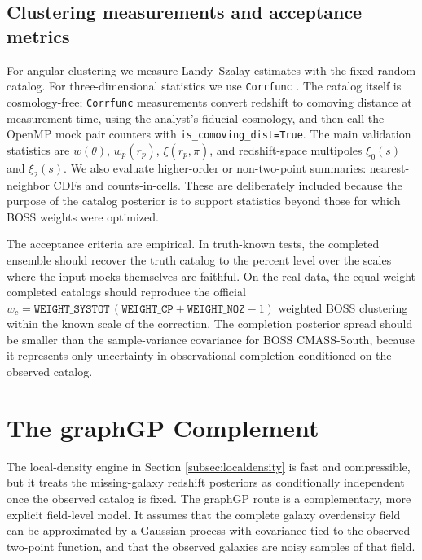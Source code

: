 \documentclass[apj]{emulateapj}
\begin{document}
\subsection{Clustering measurements and acceptance metrics}
\label{subsec:metrics}

For angular clustering we measure Landy--Szalay estimates
\citep{LandySzalay1993} with the fixed random catalog.  For three-dimensional
statistics we use \texttt{Corrfunc} \citep{Corrfunc2020}.  The catalog itself is
cosmology-free; \texttt{Corrfunc} measurements convert redshift to comoving
distance at measurement time, using the analyst's fiducial cosmology, and then
call the OpenMP mock pair counters with \texttt{is\_comoving\_dist=True}.  The
main validation statistics are $w(\theta)$, $w_p(r_p)$, $\xi(r_p,\pi)$, and
redshift-space multipoles $\xi_0(s)$ and $\xi_2(s)$.  We also evaluate
higher-order or non-two-point summaries: nearest-neighbor CDFs and
counts-in-cells.  These are deliberately included because the purpose of the
catalog posterior is to support statistics beyond those for which BOSS weights
were optimized.

The acceptance criteria are empirical.  In truth-known tests, the completed
ensemble should recover the truth catalog to the percent level over the scales
where the input mocks themselves are faithful.  On the real data, the
equal-weight completed catalogs should reproduce the official
$w_c=\texttt{WEIGHT\_SYSTOT}\,(\texttt{WEIGHT\_CP}+\texttt{WEIGHT\_NOZ}-1)$
weighted BOSS clustering within the known scale of the correction.  The
completion posterior spread should be smaller than the sample-variance
covariance for BOSS CMASS-South, because it represents only uncertainty in
observational completion conditioned on the observed catalog.

\section{The graphGP Complement}
\label{sec:graphgp}

The local-density engine in Section \ref{subsec:localdensity} is fast and
compressible, but it treats the missing-galaxy redshift posteriors as
conditionally independent once the observed catalog is fixed.  The graphGP
route is a complementary, more explicit field-level model.  It assumes that the
complete galaxy overdensity field can be approximated by a Gaussian process
with covariance tied to the observed two-point function, and that the observed
galaxies are noisy samples of that field.
\end{document}
